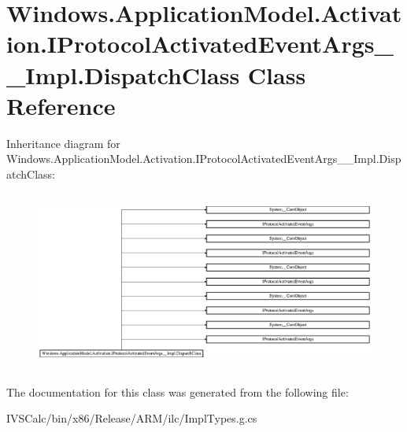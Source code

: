\hypertarget{class_windows_1_1_application_model_1_1_activation_1_1_i_protocol_activated_event_args_____impl_1_1_dispatch_class}{}\section{Windows.\+Application\+Model.\+Activation.\+I\+Protocol\+Activated\+Event\+Args\+\_\+\+\_\+\+Impl.\+Dispatch\+Class Class Reference}
\label{class_windows_1_1_application_model_1_1_activation_1_1_i_protocol_activated_event_args_____impl_1_1_dispatch_class}
Inheritance diagram for Windows.\+Application\+Model.\+Activation.\+I\+Protocol\+Activated\+Event\+Args\+\_\+\+\_\+\+Impl.\+Dispatch\+Class\+:\begin{figure}[H]
\begin{center}
\leavevmode
\includegraphics[height=5.945946cm]{class_windows_1_1_application_model_1_1_activation_1_1_i_protocol_activated_event_args_____impl_1_1_dispatch_class}
\end{center}
\end{figure}


The documentation for this class was generated from the following file\+:\begin{DoxyCompactItemize}
\item 
I\+V\+S\+Calc/bin/x86/\+Release/\+A\+R\+M/ilc/Impl\+Types.\+g.\+cs\end{DoxyCompactItemize}
